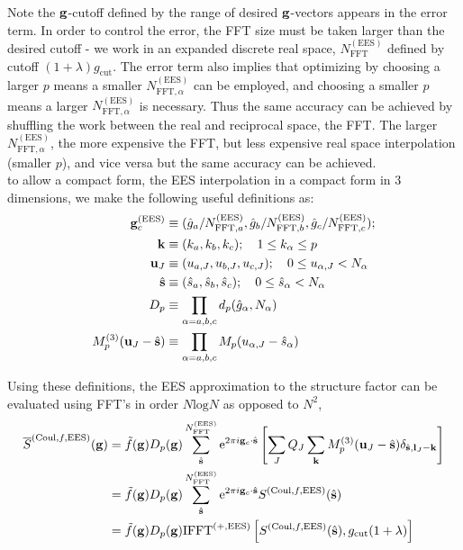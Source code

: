 \documentclass[paper=a4, fontsize=11pt]{article} %
\numberwithin{equation}{section} %
\numberwithin{figure}{section} %
\numberwithin{table}{section} %
\newcommand{\ol}{\overline}
\newcommand{\bu}{{\bf{u}}}
\newcommand{\bl}{{\bf{l}}}
\newcommand{\bk}{{\bf{k}}}
\newcommand{\bs}{{\bf{s}}}
\newcommand{\bg}{{\bf{g}}}
\newcommand{\rEES}{{\mathrm{EES}}}
\newcommand{\rcut}{{\mathrm{cut}}}
\newcommand{\re}{{\mathrm{e}}}
\newcommand{\rCo}{{\mathrm{Coul}}}
\newcommand{\rFFT}{{\mathrm{FFT}}}
\newcommand{\rl}{{\mathrm{log}}}
\newcommand{\pabc}{\prod_{\alpha=a,b,c}}
\newcommand{\al}{{\alpha}}
\begin{document}
Note the $\bg$-cutoff defined by the range of desired $\bg$-vectors appears in the error term. In order to control the error, the FFT size must be taken larger than the desired cutoff - we work in an expanded discrete real space, $N_{\mathrm{FFT}}^{(\rEES)}$ defined by cutoff $(1+\lambda)g_\rcut$. The error term also implies that optimizing by choosing a larger $p$ means a smaller $N_{\rFFT,\al}^{(\rEES)}$ can be employed, and choosing a smaller $p$ means a larger $N_{\rFFT,\al}^{(\rEES)}$ is necessary. Thus the same accuracy can be achieved by shuffling the work between the real and reciprocal space, the FFT. The larger $N_{\rFFT,\al}^{(\rEES)}$, the more expensive the FFT, but less expensive real space interpolation (smaller $p$), and vice versa  but the same accuracy can be achieved. \\

to allow a compact form, the EES interpolation in a compact form in 3 dimensions, we make the following useful definitions as:
\begin{equation}
\begin{split}
\bg_c^{(\rEES)} &\equiv (\hat{g}_{a}/N_{\rFFT,a}^{(\rEES)},\hat{g}_{b}/N_{\rFFT,b}^{(\rEES)},\hat{g}_{c}/N_{\rFFT,c}^{(\rEES)});\\
\bk &\equiv (k_a,k_b,k_c); \ \ \ 1 \leq k_\al \leq p\\
\bu_{J} &\equiv (u_{a,J},u_{b,J},u_{c,J});\ \ \ 0 \leq u_{\al,J} < N_\al \\
\hat\bs &\equiv (\hat s_{a},\hat s_{b},\hat s_{c});\ \ \ 0 \leq \hat s_\al < N_\al \\
D_p &\equiv \pabc d_p(\hat{g}_{\alpha},N_\alpha)  \\
M_p^{(3)}(\bu_{J}-\hat \bs) &\equiv \pabc M_p(u_{\alpha,J}-\hat s_{\alpha}) \\
\end{split}
\end{equation}

Using these definitions, the EES approximation to the structure factor can be evaluated using FFT's in order $N \rl N$ as opposed to $N^2$,
\begin{equation} \label{eq:sgg}
\begin{split}
\ol S^{(\rCo,f,\rEES)}(\bg)
 & = \tilde f(\bg) D_p(\bg) \sum_{\hat \bs}^{N_{\mathrm{FFT}}^{(\rEES)}} \re^{2\pi i\bg_c \cdot \hat\bs} \left[\sum_J Q_J \sum_{\bk} M_p^{(3)}(\bu_{J}-\hat \bs)\delta_{\hat \bs,\bl_J-\bk}\right] \\
 & = \tilde f(\bg) D_p(\bg) \sum_{\hat \bs}^{N_{\mathrm{FFT}}^{(\rEES)}}  \re^{2\pi i\bg_c \cdot \hat\bs} S^{(\rCo,f,\rEES)} (\hat \bs) \\
 &= \tilde f(\bg) D_p(\bg) \mathrm{IFFT}^{(+,\rEES)} \left[S^{(\rCo,f,\rEES)}(\hat \bs),g_\rcut(1+\lambda)\right]
\end{split}
\end{equation}
\end{document}
